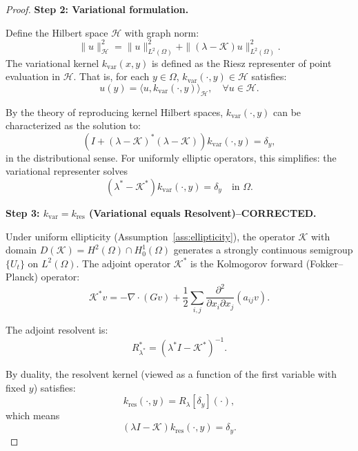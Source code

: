\documentclass[11pt,a4paper]{article}
\newcommand{\Koop}{\mathcal{K}}
\begin{document}
\begin{proof}
\textbf{Step 2: Variational formulation.}

Define the Hilbert space $\mathcal{H}$ with graph norm:
\begin{equation}
\|u\|_{\mathcal{H}}^2 = \|u\|_{L^2(\Omega)}^2 + \|(\lambda - \Koop)u\|_{L^2(\Omega)}^2.
\end{equation}
The variational kernel $k_{\mathrm{var}}(x,y)$ is defined as the Riesz representer of point evaluation in $\mathcal{H}$. That is, for each $y \in \Omega$, $k_{\mathrm{var}}(\cdot, y) \in \mathcal{H}$ satisfies:
\begin{equation}
u(y) = \langle u, k_{\mathrm{var}}(\cdot, y) \rangle_{\mathcal{H}}, \quad \forall u \in \mathcal{H}.
\end{equation}

By the theory of reproducing kernel Hilbert spaces, $k_{\mathrm{var}}(\cdot, y)$ can be characterized as the solution to:
\begin{equation}
(I + (\lambda - \Koop)^*(\lambda - \Koop)) k_{\mathrm{var}}(\cdot, y) = \delta_y,
\end{equation}
in the distributional sense. For uniformly elliptic operators, this simplifies: the variational representer solves
\begin{equation}\label{eq:var_kernel_pde}
(\lambda^* - \Koop^*) k_{\mathrm{var}}(\cdot, y) = \delta_y \quad \text{in } \Omega.
\end{equation}

\textbf{Step 3: $k_{\mathrm{var}} = k_{\mathrm{res}}$ (Variational equals Resolvent)--CORRECTED.}

Under uniform ellipticity (Assumption~\ref{ass:ellipticity}), the operator $\Koop$ with domain $D(\Koop) = H^2(\Omega) \cap H^1_0(\Omega)$ generates a strongly continuous semigroup $\{U_t\}$ on $L^2(\Omega)$. The adjoint operator $\Koop^*$ is the Kolmogorov forward (Fokker--Planck) operator:
\begin{equation}
\Koop^* v = -\nabla \cdot (Gv) + \frac{1}{2}\sum_{i,j}\frac{\partial^2}{\partial x_i \partial x_j}(a_{ij}v).
\end{equation}

The adjoint resolvent is:
\begin{equation}
R_{\lambda^*}^* = (\lambda^* I - \Koop^*)^{-1}.
\end{equation}

By duality, the resolvent kernel (viewed as a function of the first variable with fixed $y$) satisfies:
\begin{equation}
k_{\mathrm{res}}(\cdot, y) = R_\lambda[\delta_y](\cdot),
\end{equation}
which means
\begin{equation}
(\lambda I - \Koop) k_{\mathrm{res}}(\cdot, y) = \delta_y.
\end{equation}


\end{proof}
\end{document}
